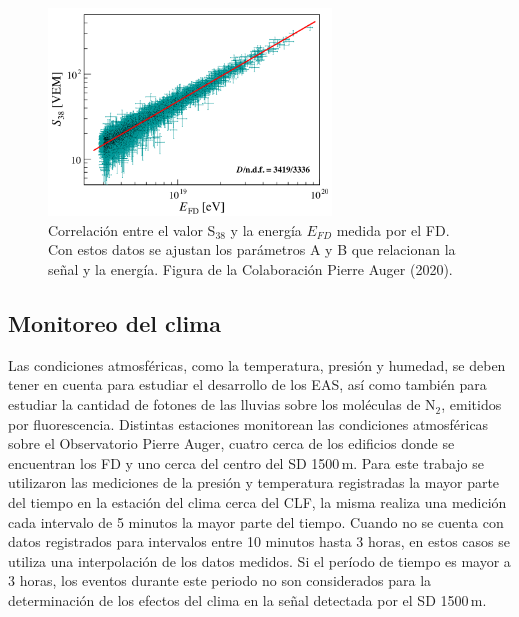 \begin{figure}[H]
	\centering
	\includegraphics[width=0.67\textwidth]{efd_s38_v2.jpg}
	\caption{Correlación entre el valor S$_{38}$ y la energía $E_{FD}$ medida por el FD. Con estos datos se ajustan los parámetros A y B que relacionan la señal y la energía.  Figura de la Colaboración Pierre Auger (2020).} 	\label{fig:efd_s38}
\end{figure}


\subsection{Monitoreo del clima}\label{seccion:clima}

Las condiciones atmosféricas, como la temperatura, presión y humedad, se deben tener en cuenta para estudiar el desarrollo de los EAS, así como también para estudiar la cantidad de fotones de las lluvias sobre los moléculas de N$_2$, emitidos por fluorescencia. Distintas estaciones monitorean las condiciones atmosféricas sobre el Observatorio Pierre Auger, cuatro cerca  de los edificios donde se encuentran los FD y uno cerca del centro del SD 1500\,m. Para este trabajo se utilizaron las mediciones de la presión y temperatura registradas la mayor parte del tiempo en la estación del clima cerca del CLF, la misma realiza una medición cada intervalo de 5 minutos la mayor parte del tiempo. Cuando no se cuenta con datos registrados para intervalos entre 10 minutos hasta 3 horas, en estos casos se utiliza una interpolación de los datos medidos. Si el período de tiempo es mayor a 3 horas, los eventos durante este periodo no son considerados para la determinación de los efectos del clima en la señal detectada por el SD 1500\,m.